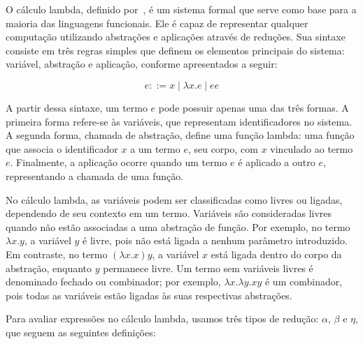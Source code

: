 



O cálculo lambda, definido por~, é um sistema formal que serve como base para a maioria das linguagens funcionais.
Ele é capaz de representar qualquer computação utilizando abstrações e aplicações através de reduções.
Sua sintaxe consiste em três regras simples que definem os elementos principais do sistema: variável, abstração e aplicação, conforme apresentados a seguir:

\begin{equation}\label{eq:lambda-calculus}
  e ::= x \mid \lambda x. e \mid e e
\end{equation}

A partir dessa sintaxe, um termo $e$ pode possuir apenas uma das três formas.
A primeira forma refere-se às variáveis, que representam identificadores no sistema.
A segunda forma, chamada de abstração, define uma função lambda: uma função que associa o identificador $x$ a um termo $e$, seu corpo, com $x$ vinculado ao termo $e$.
Finalmente, a aplicação ocorre quando um termo $e$ é aplicado a outro $e$, representando a chamada de uma função.

No cálculo lambda, as variáveis podem ser classificadas como livres ou ligadas, dependendo de seu contexto em um termo.
Variáveis são consideradas livres quando não estão associadas a uma abstração de função.
Por exemplo, no termo $\lambda x. y$, a variável $y$ é livre, pois não está ligada a nenhum parâmetro introduzido.
Em contraste, no termo $(\lambda x. x) y$, a variável $x$ está ligada dentro do corpo da abstração, enquanto $y$ permanece livre.
Um termo sem variáveis livres é denominado fechado ou combinador; por exemplo, $\lambda x. \lambda y. x y$ é um combinador, pois todas as variáveis estão ligadas às suas respectivas abstrações.

Para avaliar expressões no cálculo lambda, usamos três tipos de redução: $\alpha$, $\beta$ e $\eta$, que seguem as seguintes definições:

